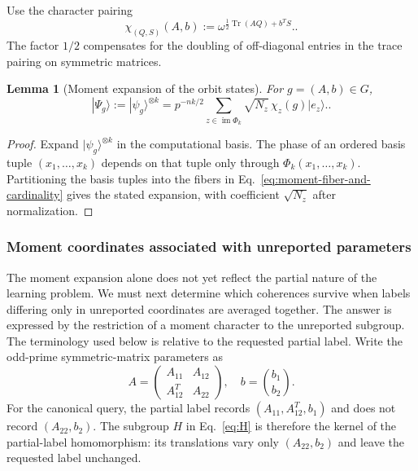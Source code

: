 \documentclass[11pt]{article}
\newcommand{\Tr}{\operatorname{Tr}}
\newcommand{\1}{\mathbf 1}
\theoremstyle{plain}
\newtheorem{lemma}[theorem]{Lemma}
\theoremstyle{definition}
\theoremstyle{remark}
\begin{document}
Use the character pairing
\begin{equation}
 \chi_{(Q,S)}(A,b):=\omega^{\frac12\Tr(AQ)+b^TS}.       \label{eq:pairing}.
\end{equation}
The factor $1/2$ compensates for the doubling of off-diagonal entries in the
trace pairing on symmetric matrices.

\begin{lemma}[Moment expansion of the orbit states]
\label{lem:orbit-moment-expansion}
For $g=(A,b)\in G$,
\begin{equation}
 |\Psi_g\rangle:=|\psi_g\rangle^{\otimes k}
 =p^{-nk/2}\sum_{z\in\operatorname{im}\Phi_k}
 \sqrt{N_z}\,\chi_z(g)|e_z\rangle.              \label{eq:orbit-sector-expansion}.
\end{equation}
\end{lemma}
\begin{proof}
Expand $|\psi_g\rangle^{\otimes k}$ in the computational basis.  The phase
of an ordered basis tuple $(x_1,\ldots,x_k)$ depends on that tuple only through
$\Phi_k(x_1,\ldots,x_k)$.  Partitioning the basis tuples into the fibers in
Eq.~\eqref{eq:moment-fiber-and-cardinality} gives the stated expansion, with
coefficient $\sqrt{N_z}$ after normalization.
\end{proof}

\subsubsection{Moment coordinates associated with unreported parameters}
The moment expansion alone does not yet reflect the partial nature of the learning problem.  We must next determine which coherences survive when labels differing only in unreported coordinates are averaged together.  The answer is expressed by the restriction of a moment character to the unreported subgroup.  The terminology used below is relative to the requested partial label.  Write
the odd-prime symmetric-matrix parameters as
\begin{equation}
 A=\begin{pmatrix}A_{11}&A_{12}\\A_{12}^T&A_{22}\end{pmatrix},
 \quad b=\binom{b_1}{b_2}.
 \label{eq:finite-size-parameter-split}
\end{equation}
For the canonical query, the partial label records $(A_{11},A_{12}^T,b_1)$
and does not record $(A_{22},b_2)$.  The subgroup $H$ in Eq.~\eqref{eq:H} is
therefore the kernel of the partial-label homomorphism: its translations vary
only $(A_{22},b_2)$ and leave the requested label unchanged.
\end{document}
